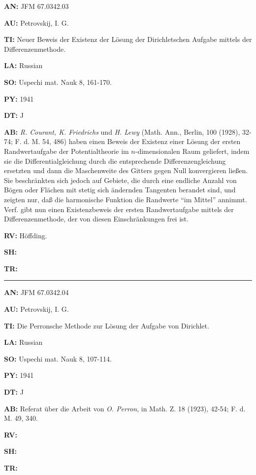 \item{\bf AN:} JFM 67.0342.03
\item{\bf AU:} Petrovskij, I. G.
\item{\bf TI:} Neuer Beweis der Existenz der L\"osung der
Dirichletschen Aufgabe mittels der Differenzenmethode.
\item{\bf LA:} Russian
\item{\bf SO:} Uspechi mat. Nauk 8, 161-170.
\item{\bf PY:} 1941
\item{\bf DT:} J
\item{\bf AB:}{\parindent15pt
 {\it R. Courant, K.
Friedrichs} und {\it H. Lewy} (Math. Ann., Berlin, 100 (1928), 32-74;
F. d. M. 54, 486) haben einen Beweis der Existenz einer L\"osung der ersten
Randwertaufgabe der
Potentialtheorie im $n$-dimensionalen Raum geliefert, indem sie die
Differentialgleichung
durch die entsprechende Differenzengleichung ersetzten und dann
die Maschenweite des
Gitters gegen Null konvergieren lie{\ss}en. Sie beschr\"ankten
sich
jedoch auf Gebiete,
die durch eine endliche Anzahl von B\"ogen oder Fl\"achen mit
stetig sich \"andernden Tangenten berandet sind, und zeigten nur, da{\ss} die
harmonische
Funktion die Randwerte ``im Mittel'' annimmt. Verf. gibt nun einen
Existenzbeweis der ersten
Randwertaufgabe mittels der Differenzenmethode, der von diesen
Einschr\"ankungen frei ist.
}
\item{\bf RV:} H\"offding.
\item{\bf SH:}
\item{\bf TR:}

\bigskip\par\noindent\hrule\bigskip\par

\item{\bf AN:} JFM 67.0342.04
\item{\bf AU:} Petrovskij, I. G.
\item{\bf TI:} Die Perronsche Methode zur L\"osung der Aufgabe von Dirichlet.
\item{\bf LA:} Russian
\item{\bf SO:} Uspechi mat. Nauk 8, 107-114.
\item{\bf PY:} 1941
\item{\bf DT:} J
\item{\bf AB:}{\parindent15pt
 Referat \"uber
die Arbeit von {\it O. Perron}, in Math. Z. 18 (1923), 42-54; F. d. M.
49, 340.
}
\item{\bf RV:}
\item{\bf SH:}
\item{\bf TR:}

